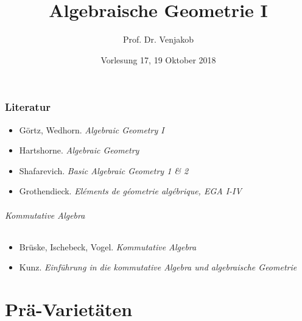 \documentclass[12pt,a4paper]{article}
\theoremstyle{definition}
\theoremstyle{definition}
\theoremstyle{plain}
\theoremstyle{plain}
\theoremstyle{plain}
\theoremstyle{remark}
\theoremstyle{plain}
\theoremstyle{remark}
\theoremstyle{definition}
\theoremstyle{plain}
\begin{document}
\title{Algebraische Geometrie I}
\author{Prof. Dr. Venjakob}
\date{Vorlesung 17, 19 Oktober 2018}
\maketitle

\section*{Literatur}
\begin{itemize}
\item Görtz, Wedhorn. \emph{Algebraic Geometry I}
\item Hartshorne. \emph{Algebraic Geometry}
\item Shafarevich. \emph{Basic Algebraic Geometry 1 \& 2}
\item Grothendieck. \emph{Eléments de géometrie algébrique, EGA I-IV}
\end{itemize}

\paragraph{Kommutative Algebra}
\begin{itemize}
\item Brüske, Ischebeck, Vogel. \emph{Kommutative Algebra}
\item Kunz. \emph{Einführung in die kommutative Algebra und algebraische Geometrie}
\end{itemize}

\tableofcontents{}
\newpage{}

\part{Prä-Varietäten}














\end{document}
